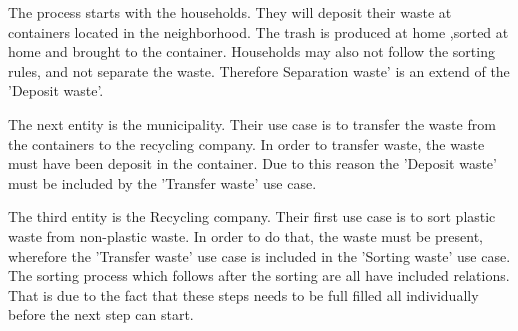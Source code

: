 \noindent The process starts with the households. They will deposit their waste at containers located in the neighborhood. The trash is produced at home ,sorted at home and brought to the container. Households may also not follow the sorting rules, and not separate the waste. Therefore Separation waste' is an extend of the 'Deposit waste'. 

\noindent The next entity is the municipality. Their use case is to transfer the waste from the containers to the recycling company. In order to transfer waste, the waste must have been deposit in the container. Due to this reason the 'Deposit waste' must be included by the 'Transfer waste' use case.

\noindent The third entity is the Recycling company. Their first use case is to sort plastic waste from non-plastic waste. In order to do that, the waste must be present, wherefore the 'Transfer waste' use case is included in the 'Sorting waste' use case. The sorting process which follows after the sorting are all have included relations. That is due to the fact that these steps needs to be full filled all individually before the next step can start. 

